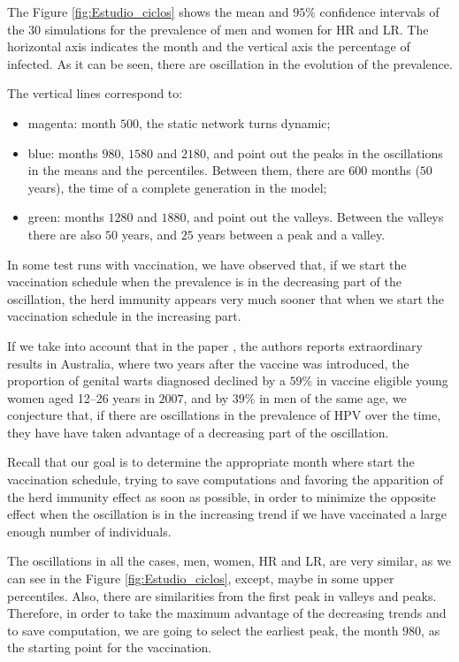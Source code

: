 The Figure \ref{fig:Estudio_ciclos} shows the mean and $95\%$ confidence intervals of the $30$ simulations for the prevalence of men and women for HR and LR. The horizontal axis indicates the month and the vertical axis the percentage of infected. As it can be seen, there are oscillation in the evolution of the prevalence.

The vertical lines correspond to:
\begin{itemize}
	\item magenta: month $500$, the static network turns dynamic;
	\item blue: months $980$, $1580$ and $2180$, and point out the peaks in the oscillations in the means and the percentiles. Between them, there are $600$ months ($50$ years), the time of a complete generation in the model;
	\item green: months $1280$  and $1880$, and point out the valleys. Between the valleys there are also $50$ years, and $25$ years between a peak and a valley. 	
\end{itemize}

In some test runs with vaccination, we have observed that, if we start the vaccination schedule when the prevalence is in the decreasing part of the oscillation, the herd immunity appears very much sooner that when we start the vaccination schedule in the increasing part.

If we take into account that in the paper \cite{Ali}, the authors reports extraordinary results in Australia, where two years after the vaccine was introduced, the proportion of genital warts diagnosed declined by a $59\%$ in vaccine eligible young women aged 12--26 years in $2007$, and by $39\%$ in men of the same age, we conjecture that, if there are oscillations in the prevalence of HPV over the time, they have have taken advantage of a decreasing part of the oscillation.

Recall that our goal is to determine the appropriate month where start the vaccination schedule, trying to save computations and favoring the apparition of the herd immunity effect as soon as possible, in order to minimize the opposite effect when the oscillation is in the increasing trend if we have vaccinated a large enough number of individuals.

The oscillations in all the cases, men, women, HR and LR, are very similar, as we can see in the Figure \ref{fig:Estudio_ciclos}, except, maybe in some upper percentiles. Also, there are similarities from the first peak in valleys and peaks. Therefore, in order to take the maximum advantage of the decreasing trends and to save computation, we are going to select the earliest peak, the month $980$, as the starting point for the vaccination.

